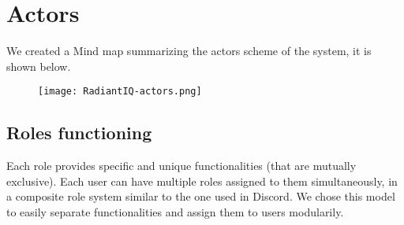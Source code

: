 \section{Actors} \label{actors}
We created a Mind map summarizing the actors scheme of the system, it is shown below.
\begin{figure}[h]
	\centering
	\texttt{[image: RadiantIQ-actors.png]}
\end{figure}

\subsection{Roles functioning}
Each role provides specific and unique functionalities (that are mutually exclusive). Each user can have multiple roles assigned to them simultaneously, in a composite role system similar to the one used in Discord. We chose this model to easily separate functionalities and assign them to users modularily.
